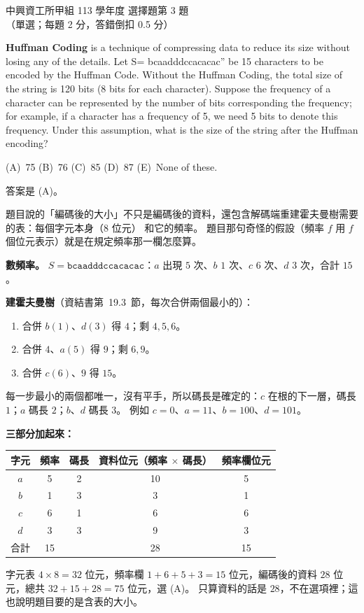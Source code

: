 \begin{pastexam}[label={px:nchu-113-dsa-03}]{中興資工所甲組 113 學年度 選擇題第 3 題}
（單選；每題 2 分，答錯倒扣 0.5 分）

\textbf{Huffman Coding} is a technique of compressing data to reduce its size without losing any of the
details. Let S= bcaadddccacacac'' be 15 characters to be encoded by the Huffman Code. Without the
Huffman Coding, the total size of the string is 120 bits (8 bits for each character). Suppose the
frequency of a character can be represented by the number of bits corresponding the frequency; for
example, if a character has a frequency of 5, we need 5 bits to denote this frequency. Under this
assumption, what is the size of the string after the Huffman encoding?

(A)~75 \qquad (B)~76 \qquad (C)~85 \qquad (D)~87 \qquad (E)~None of these.
\end{pastexam}

\begin{pastsoln}
答案是 (A)。

題目說的「編碼後的大小」不只是編碼後的資料，還包含解碼端重建霍夫曼樹需要的表：每個字元本身（8 位元）
和它的頻率。 題目那句奇怪的假設（頻率 $f$ 用 $f$ 個位元表示）就是在規定頻率那一欄怎麼算。

\textbf{數頻率。} $S = \texttt{bcaadddccacacac}$：$a$ 出現 $5$ 次、$b$ $1$ 次、$c$ $6$ 次、$d$ $3$ 次，合計 $15$。

\textbf{建霍夫曼樹}（資結書第~19.3~節，每次合併兩個最小的）：
\begin{enumerate}
\item 合併 $b(1)$、$d(3)$ 得 $4$；剩 $4, 5, 6$。
\item 合併 $4$、$a(5)$ 得 $9$；剩 $6, 9$。
\item 合併 $c(6)$、$9$ 得 $15$。
\end{enumerate}
每一步最小的兩個都唯一，沒有平手，所以碼長是確定的：$c$ 在根的下一層，碼長 $1$；$a$ 碼長 $2$；$b$、$d$
碼長 $3$。 例如 $c = 0$、$a = 11$、$b = 100$、$d = 101$。

\textbf{三部分加起來：}
\begin{center}
\begin{tabular}{ccccc}
\toprule
字元 & 頻率 & 碼長 & 資料位元（頻率 $\times$ 碼長） & 頻率欄位元 \\
\midrule
$a$ & 5 & 2 & 10 & 5 \\
$b$ & 1 & 3 & 3 & 1 \\
$c$ & 6 & 1 & 6 & 6 \\
$d$ & 3 & 3 & 9 & 3 \\
\midrule
合計 & 15 & & 28 & 15 \\
\bottomrule
\end{tabular}
\end{center}
字元表 $4 \times 8 = 32$ 位元，頻率欄 $1 + 6 + 5 + 3 = 15$ 位元，編碼後的資料 $28$ 位元，總共
$32 + 15 + 28 = 75$ 位元，選 (A)。 只算資料的話是 $28$，不在選項裡；這也說明題目要的是含表的大小。
\end{pastsoln}
